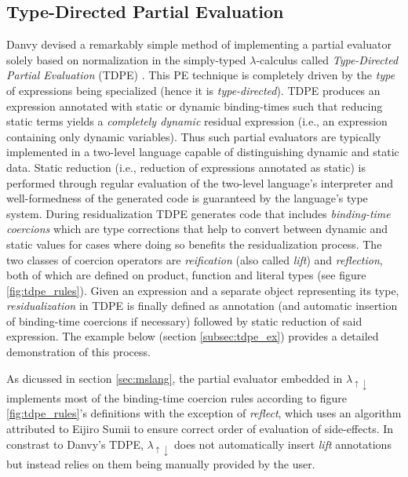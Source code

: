 \documentclass[a4paper,12pt,twoside,openright]{report}
\theoremstyle{definition}
\newcommand{\mslang}{$\lambda_{\uparrow\downarrow}$}
\begin{document}
\subsection{Type-Directed Partial Evaluation}\label{subsec:tdpe}
Danvy devised a remarkably simple method of implementing a partial evaluator solely based on normalization in the simply-typed $\lambda$-calculus called \textit{Type-Directed Partial Evaluation} (TDPE) \cite{danvy1999type}. This PE technique is completely driven by the \textit{type} of expressions being specialized (hence it is \textit{type-directed}). TDPE produces an expression annotated with static or dynamic binding-times such that reducing static terms yields a \textit{completely dynamic} residual expression (i.e., an expression containing only dynamic variables). Thus such partial evaluators are typically implemented in a two-level language capable of distinguishing dynamic and static data. Static reduction (i.e., reduction of expressions annotated as static) is performed through regular evaluation of the two-level language's interpreter and well-formedness of the generated code is guaranteed by the language's type system. During residualization TDPE generates code that includes \textit{binding-time coercions} which are type corrections that help to convert between dynamic and static values for cases where doing so benefits the residualization process. The two classes of coercion operators are \textit{reification} (also called \textit{lift}) and \textit{reflection}, both of which are defined on product, function and literal types \cite{grobauer2001second} (see figure \ref{fig:tdpe_rules}). Given an expression and a separate object representing its type, \textit{residualization} in TDPE is finally defined as annotation (and automatic insertion of binding-time coercions if necessary) followed by static reduction of said expression. The example below (section \ref{subsec:tdpe_ex}) provides a detailed demonstration of this process.

As dicussed in section \ref{sec:mslang}, the partial evaluator embedded in \mslang{} \cite{amin2017collapsing} implements most of the binding-time coercion rules according to figure \ref{fig:tdpe_rules}'s definitions with the exception of \textit{reflect}, which uses an algorithm attributed to Eijiro Sumii \cite{hatcliff2007partial} to ensure correct order of evaluation of side-effects. In constrast to Danvy's TDPE, \mslang{} does not automatically insert \textit{lift} annotations but instead relies on them being manually provided by the user.
\end{document}

